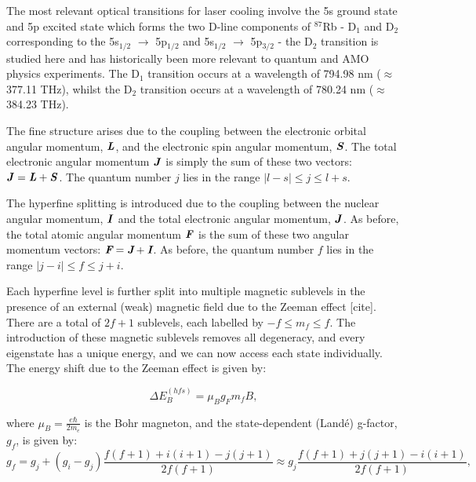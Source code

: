 \documentclass[12pt,twoside]{article}
\begin{document}
The most relevant optical transitions for laser cooling involve the 5s ground state and 5p excited state which forms the two D-line components of $^{87}$Rb - D$_1$ and D$_2$ corresponding to the 5s$_{1/2}$ $\rightarrow$ 5p$_{1/2}$ and 5s$_{1/2}$ $\rightarrow$ 5p$_{3/2}$ - the D$_2$ transition is studied here and has historically been more relevant to quantum and AMO physics experiments. The D${_1}$ transition occurs at a wavelength of 794.98 nm ($\approx$ 377.11 THz), whilst the D${_2}$ transition occurs at a wavelength of 780.24 nm ($\approx$ 384.23 THz).

The fine structure arises due to the coupling between the electronic orbital angular momentum, $\textbf{\textit{L}}$, and the electronic spin angular momentum, $\textbf{\textit{S}}$. The total electronic angular momentum $\textbf{\textit{J}}$ is simply the sum of these two vectors: $\textbf{\textit{J}} = \textbf{\textit{L}} + \textbf{\textit{S}}$. The quantum number $j$ lies in the range $|l - s| \le j \le l + s$.

The hyperfine splitting is introduced due to the coupling between the nuclear angular momentum, $\textbf{\textit{I}}$ and the total electronic angular momentum, $\textbf{\textit{J}}$. As before, the total atomic angular momentum $\textbf{\textit{F}}$ is the sum of these two angular momentum vectors: $\textit{\textbf{F}} = \textit{\textbf{J}} + \textit{\textbf{I}}$. As before, the quantum number $f$ lies in the range $|j - i| \le f \le j + i$.

Each hyperfine level is further split into multiple magnetic sublevels in the presence of an external (weak) magnetic field due to the Zeeman effect [cite]. There are a total of $2f + 1$ sublevels, each labelled by $-f \le m_f \le f$. The introduction of these magnetic sublevels removes all degeneracy, and every eigenstate has a unique energy, and we can now access each state individually. The energy shift due to the Zeeman effect is given by:

\begin{equation}
    \Delta E_B^{(hfs)} = \mu_B g_F m_f B,
    \label{eqn: zeeman energy}
\end{equation}

where $\mu_B = \frac{e\hbar}{2m_e}$ is the Bohr magneton, and the state-dependent (Land\'e) g-factor, $g_f$, is given by:
\begin{equation}
    g_f = g_j + (g_i - g_j) \frac{f(f+1) + i(i+1) - j(j+1)}{2f(f+1)} 
    \approx g_j \frac{f(f+1) + j(j+1) - i(i+1)}{2f(f+1)},
    \label{eqn: g factor}
\end{equation}
\end{document}
